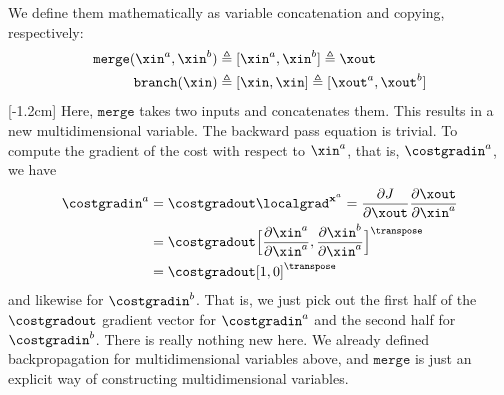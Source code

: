 We define them mathematically as variable concatenation and copying, respectively:
\begin{align}
    \texttt{merge}(\xin^a, \xin^b) & \triangleq [\xin^a, \xin^b] \triangleq \xout          \\
    \texttt{branch}(\xin)          & \triangleq [\xin, \xin] \triangleq [\xout^a, \xout^b]
\end{align}
[-1.2cm]
Here, $\texttt{merge}$ takes two inputs and concatenates them. This results in a new multidimensional variable. The backward pass equation is trivial. To compute the gradient of the cost with respect to $\xin^{a}$, that is, $\costgradin^a$, we have
\begin{align}
    \costgradin^{a} & = \costgradout \localgrad^{\mathbf{x}^a} = \frac{\partial J}{\partial \xout} \frac{\partial \xout}{\partial \xin^{a}}        \\ %
                    & = \costgradout \Big[\frac{\partial \xin^{a}}{\partial \xin^{a}}, \frac{\partial \xin^{b}}{\partial \xin^{a}}\Big]^\transpose \\
                    & = \costgradout [1, 0]^\transpose
\end{align}
and likewise for $\costgradin^b$. That is, we just pick out the first half of the $\costgradout$ gradient vector for $\costgradin^a$ and the second half for $\costgradin^b$. There is really nothing new here. We already defined backpropagation for multidimensional variables above, and $\texttt{merge}$ is just an explicit way of constructing multidimensional variables.


